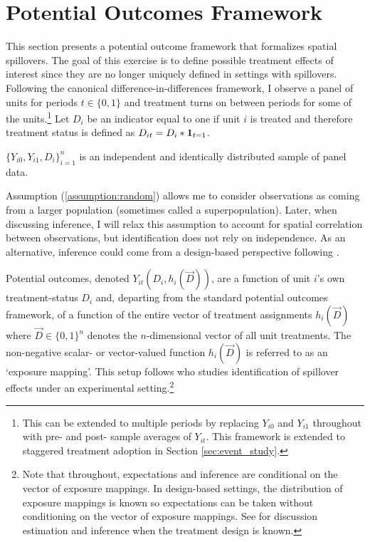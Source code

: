 \documentclass[11pt]{article}
\begin{document}
\section{Potential Outcomes Framework}
\label{sec:po_framework}

This section presents a potential outcome framework that formalizes spatial spillovers. The goal of this exercise is to define possible treatment effects of interest since they are no longer uniquely defined in settings with spillovers. Following the canonical difference-in-differences framework, I observe a panel of units for periods $t \in \{0,1\}$ and treatment turns on between periods for some of the units.\footnote{This can be extended to multiple periods by replacing $Y_{i0}$ and $Y_{i1}$ throughout with pre- and post- sample averages of $Y_{it}$. This framework is extended to staggered treatment adoption in Section \ref{sec:event_study}.} Let $D_{i}$ be an indicator equal to one if unit $i$ is treated and therefore treatment status is defined as $D_{it} = D_{i} * \mathbf{1}_{t = 1}$.

\begin{assumption}\label{assumption:random}
    $\{ Y_{i0}, Y_{i1}, D_{i} \}_{i = 1}^{n}$ is an independent and identically distributed sample of panel data.
\end{assumption}

Assumption (\ref{assumption:random}) allows me to consider observations as coming from a larger population (sometimes called a superpopulation). Later, when discussing inference, I will relax this assumption to account for spatial correlation between observations, but identification does not rely on independence. As an alternative, inference could come from a design-based perspective following \citet{Athey_Imbens_2021}.

Potential outcomes, denoted $Y_{it}(D_i, h_i(\vec{D}))$, are a function of unit $i$'s own treatment-status $D_i$ and, departing from the standard potential outcomes framework, of a function of the entire vector of treatment assignments $h_i(\vec{D})$ where $\vec{D} \in \{0,1 \}^n$ denotes the $n$-dimensional vector of all unit treatments. The non-negative scalar- or vector-valued function $h_i(\vec{D})$ is referred to as an `exposure mapping'. This setup follows \citet{Vazquez-Bare_2019} who studies identification of spillover effects under an experimental setting.\footnote{Note that throughout, expectations and inference are conditional on the vector of exposure mappings. In design-based settings, the distribution of exposure mappings is known so expectations can be taken without conditioning on the vector of exposure mappings. See \citet{Savje_Aronow_Hudgens_2021} for discussion estimation and inference when the treatment design is known.}
\end{document}
